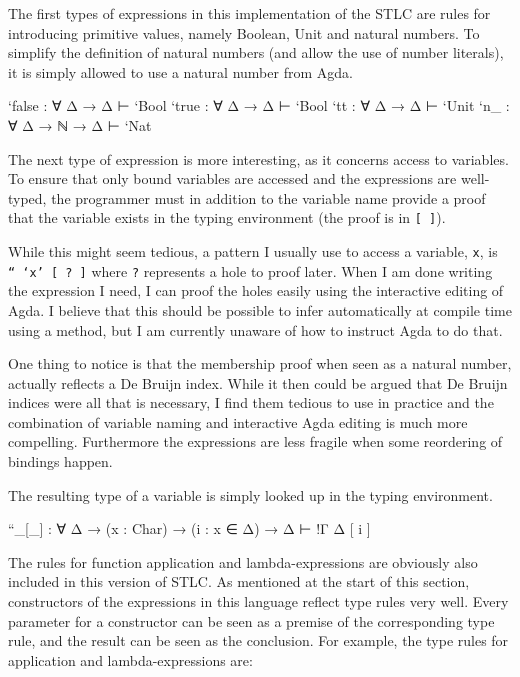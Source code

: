 \documentclass{article}
\begin{document}
The first types of expressions in this implementation of the STLC are rules for introducing primitive values, namely
Boolean, Unit and natural numbers. To simplify the definition of natural numbers (and allow the use of number literals), it is simply
allowed to use a natural number from Agda.

\begin{code}
    `false           : ∀ {Δ} → Δ ⊢ `Bool
    `true            : ∀ {Δ} → Δ ⊢ `Bool
    `tt              : ∀ {Δ} → Δ ⊢ `Unit
    `n_              : ∀ {Δ} → ℕ → Δ ⊢ `Nat
\end{code}

The next type of expression is more interesting, as it concerns access to variables. To ensure that only bound variables
are accessed and the expressions are well-typed, the programmer must in addition to the variable name provide a proof that the variable exists
in the typing environment (the proof is in \texttt{[ ]}).

While this might seem tedious, a pattern I usually use to access a variable, \texttt{x}, is \,\,\, \texttt{`` `x' [ ? ]} where \texttt{?} represents a hole to proof later.
When I am done writing the expression I need, I can proof the holes easily using the interactive
editing of Agda. I believe that this should be possible to infer automatically at compile time using a method, but I am currently unaware of how
to instruct Agda to do that.

One thing to notice is that the membership proof when seen as a natural number, actually reflects a De Bruijn index. While it then could be argued that
De Bruijn indices were all that is necessary, I find them tedious to use in practice and the combination of variable naming and interactive Agda editing is much more compelling.
Furthermore the expressions are less fragile when some reordering of bindings happen.

The resulting type of a variable is simply looked up in the typing environment.

\begin{code}
    ``_[_]  : ∀ {Δ} → (x : Char) → (i : x ∈ Δ) → Δ ⊢ !Γ Δ [ i ]
\end{code}

The rules for function application and lambda-expressions are obviously also included in this version of STLC.
As mentioned at the start of this section, constructors of the expressions in this language reflect type rules very well.
Every parameter for a constructor can be seen as a premise of the corresponding type rule, and the result can be seen
as the conclusion.
For example, the type rules for application and lambda-expressions are:
\begin{figure}[H]
\label{fig:lambdaapprule}
\end{figure}
\end{document}
